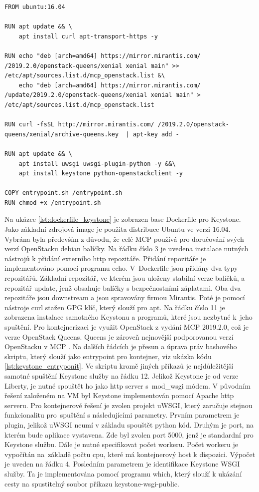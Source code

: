 \begin{lstlisting}[caption={Základní Dockerfile pro Keystone image, zdroj: vlastní tvorba},label={lst:dockerfile_keystone}]
FROM ubuntu:16.04

RUN apt update && \
    apt install curl apt-transport-https -y

RUN echo "deb [arch=amd64] https://mirror.mirantis.com/ /2019.2.0/openstack-queens/xenial xenial main" >> /etc/apt/sources.list.d/mcp_openstack.list &\ 
    echo "deb [arch=amd64] https://mirror.mirantis.com/ /update/2019.2.0/openstack-queens/xenial xenial main" > /etc/apt/sources.list.d/mcp_openstack.list

RUN curl -fsSL http://mirror.mirantis.com/ /2019.2.0/openstack-queens/xenial/archive-queens.key  | apt-key add -     

RUN apt update && \
    apt install uwsgi uwsgi-plugin-python -y &&\
    apt install keystone python-openstackclient -y

COPY entrypoint.sh /entrypoint.sh
RUN chmod +x /entrypoint.sh
\end{lstlisting}

Na ukázce \ref{lst:dockerfile_keystone} je zobrazen base Dockerfile pro Keystone. Jako základní zdrojová image je použita distribuce Ubuntu ve verzi 16.04. Vybrána byla především z důvodu, že celé MCP používá pro doručování svých verzí OpenStacku debian balíčky. Na řádku číslo 3 je uvedena instalace nutných nástrojů k přidání externího http repozitáře. Přidání repozitáře je implementováno pomocí programu echo. V Dockerfile jsou přidány dva typy repozitářů. Základní repozitář, ve kterém jsou uloženy stabilní verze balíčků, a repozitář update, jenž obsahuje balíčky s bezpečnostními záplatami. Oba dva repozitáře jsou downstream a jsou spravovány firmou Mirantis. Poté je pomocí nástroje curl stažen GPG klíč, který slouží pro apt. Na řádku číslo 11 je zobrazena instalace samotného Keystonu a programů, které jsou nezbytné k jeho spuštění. Pro kontejnerizaci je využit OpenStack z vydání MCP 2019.2.0, což je verze OpenStack Queens. Queens je zároveň nejnovější podporovanou verzí OpenStacku v MCP \cite{mirantis_releasemap}. Na dalších řádcích je přesun a úprava práv bashového skriptu, který slouží jako entrypoint pro kontejner, viz ukázka kódu \ref{lst:keystone_entryponit}. Ve skriptu kromě jiných příkazů je nejdůležitější samotné spuštění Keystone služby na řádku 12. Jelikož Keystone je od verze Liberty, je nutné spouštět ho jako http server s mod\_wsgi módem. V původním řešení založeném na VM byl Keystone implementován pomocí Apache http serveru. Pro kontejnerové řešení je zvolen projekt uWSGI, který zaručuje stejnou funkcionalitu pro spuštění s následujícími parametry. Prvním parametrem je plugin, jelikož uWSGI neumí v základu spouštět python kód. Druhým je port, na kterém bude aplikace vystavena. Zde byl zvolen port 5000, jenž je standardní pro Keystone službu. Dále je nutné specifikovat počet workeru. Počet workeru je vypočítán na základě počtu cpu, které má kontejnerový host k dispozici. Výpočet je uveden na řádku 4. Posledním parametrem je identifikace Keystone WSGI služby. Ta je implementována pomocí programu which, který slouží k ukázání cesty na spustitelný soubor příkazu keystone-wsgi-public.

